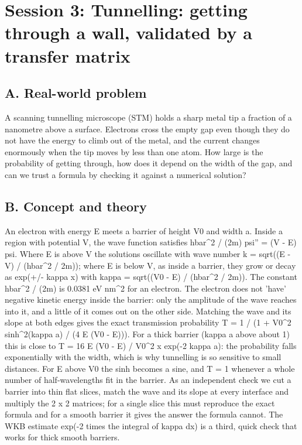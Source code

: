 \documentclass[11pt,a4paper]{article}
\begin{document}
\section{Session 3: Tunnelling: getting through a wall, validated by a transfer matrix}

\subsection*{A. Real-world problem}
A scanning tunnelling microscope (STM) holds a sharp metal tip a fraction of a nanometre above a surface. Electrons cross the empty gap even though they do not have the energy to climb out of the metal, and the current changes enormously when the tip moves by less than one atom. How large is the probability of getting through, how does it depend on the width of the gap, and can we trust a formula by checking it against a numerical solution?

\subsection*{B. Concept and theory}
An electron with energy E meets a barrier of height V0 and width a. Inside a region with potential V, the wave function satisfies hbar\textasciicircum{}2 / (2m) psi'' = (V - E) psi. Where E is above V the solutions oscillate with wave number k = sqrt((E - V) / (hbar\textasciicircum{}2 / 2m)); where E is below V, as inside a barrier, they grow or decay as exp(+/- kappa x) with kappa = sqrt((V0 - E) / (hbar\textasciicircum{}2 / 2m)). The constant hbar\textasciicircum{}2 / (2m) is 0.0381 eV nm\textasciicircum{}2 for an electron. The electron does not 'have' negative kinetic energy inside the barrier: only the amplitude of the wave reaches into it, and a little of it comes out on the other side. Matching the wave and its slope at both edges gives the exact transmission probability T = 1 / (1 + V0\textasciicircum{}2 sinh\textasciicircum{}2(kappa a) / (4 E (V0 - E))). For a thick barrier (kappa a above about 1) this is close to T = 16 E (V0 - E) / V0\textasciicircum{}2 x exp(-2 kappa a): the probability falls exponentially with the width, which is why tunnelling is so sensitive to small distances. For E above V0 the sinh becomes a sine, and T = 1 whenever a whole number of half-wavelengths fit in the barrier. As an independent check we cut a barrier into thin flat slices, match the wave and its slope at every interface and multiply the 2 x 2 matrices; for a single slice this must reproduce the exact formula and for a smooth barrier it gives the answer the formula cannot. The WKB estimate exp(-2 times the integral of kappa dx) is a third, quick check that works for thick smooth barriers.
\end{document}
